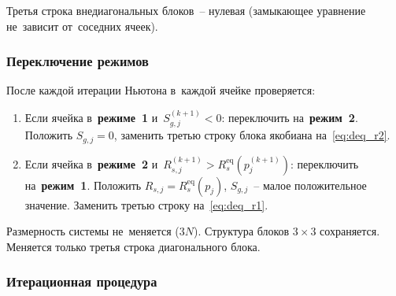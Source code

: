 \documentclass[12pt,a4paper]{article}
\begin{document}
Третья строка внедиагональных блоков~-- нулевая (замыкающее
уравнение не~зависит от~соседних ячеек).


\subsubsection{Переключение режимов}\label{sssec:switching_disc}

После каждой итерации Ньютона в~каждой ячейке проверяется:
\begin{enumerate}[nosep]
  \item Если ячейка в~\textbf{режиме~1} и~$S_{g,j}^{(k+1)} < 0$:
        переключить на~\textbf{режим~2}. Положить $S_{g,j} = 0$,
        заменить третью строку блока якобиана
        на~\eqref{eq:deq_r2}.
  \item Если ячейка в~\textbf{режиме~2}
        и~$R_{s,j}^{(k+1)} > R_s^{\text{eq}}(p_j^{(k+1)})$:
        переключить на~\textbf{режим~1}. Положить
        $R_{s,j} = R_s^{\text{eq}}(p_j)$, $S_{g,j}$~-- малое
        положительное значение. Заменить третью строку
        на~\eqref{eq:deq_r1}.
\end{enumerate}

Размерность системы не~меняется ($3N$). Структура блоков
$3\times 3$ сохраняется. Меняется только третья строка
диагонального блока.


\subsubsection{Итерационная процедура}
\end{document}
